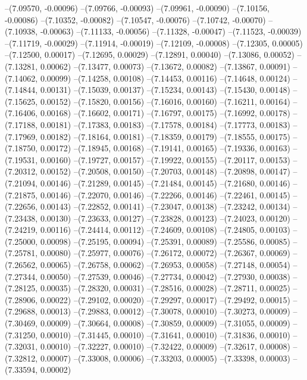 --(7.09570, -0.00096)
--(7.09766, -0.00093)
--(7.09961, -0.00090)
--(7.10156, -0.00086)
--(7.10352, -0.00082)
--(7.10547, -0.00076)
--(7.10742, -0.00070)
--(7.10938, -0.00063)
--(7.11133, -0.00056)
--(7.11328, -0.00047)
--(7.11523, -0.00039)
--(7.11719, -0.00029)
--(7.11914, -0.00019)
--(7.12109, -0.00008)
--(7.12305, 0.00005)
--(7.12500, 0.00017)
--(7.12695, 0.00029)
--(7.12891, 0.00040)
--(7.13086, 0.00052)
--(7.13281, 0.00062)
--(7.13477, 0.00073)
--(7.13672, 0.00082)
--(7.13867, 0.00091)
--(7.14062, 0.00099)
--(7.14258, 0.00108)
--(7.14453, 0.00116)
--(7.14648, 0.00124)
--(7.14844, 0.00131)
--(7.15039, 0.00137)
--(7.15234, 0.00143)
--(7.15430, 0.00148)
--(7.15625, 0.00152)
--(7.15820, 0.00156)
--(7.16016, 0.00160)
--(7.16211, 0.00164)
--(7.16406, 0.00168)
--(7.16602, 0.00171)
--(7.16797, 0.00175)
--(7.16992, 0.00178)
--(7.17188, 0.00181)
--(7.17383, 0.00183)
--(7.17578, 0.00184)
--(7.17773, 0.00183)
--(7.17969, 0.00182)
--(7.18164, 0.00181)
--(7.18359, 0.00179)
--(7.18555, 0.00175)
--(7.18750, 0.00172)
--(7.18945, 0.00168)
--(7.19141, 0.00165)
--(7.19336, 0.00163)
--(7.19531, 0.00160)
--(7.19727, 0.00157)
--(7.19922, 0.00155)
--(7.20117, 0.00153)
--(7.20312, 0.00152)
--(7.20508, 0.00150)
--(7.20703, 0.00148)
--(7.20898, 0.00147)
--(7.21094, 0.00146)
--(7.21289, 0.00145)
--(7.21484, 0.00145)
--(7.21680, 0.00146)
--(7.21875, 0.00146)
--(7.22070, 0.00146)
--(7.22266, 0.00146)
--(7.22461, 0.00145)
--(7.22656, 0.00143)
--(7.22852, 0.00141)
--(7.23047, 0.00138)
--(7.23242, 0.00134)
--(7.23438, 0.00130)
--(7.23633, 0.00127)
--(7.23828, 0.00123)
--(7.24023, 0.00120)
--(7.24219, 0.00116)
--(7.24414, 0.00112)
--(7.24609, 0.00108)
--(7.24805, 0.00103)
--(7.25000, 0.00098)
--(7.25195, 0.00094)
--(7.25391, 0.00089)
--(7.25586, 0.00085)
--(7.25781, 0.00080)
--(7.25977, 0.00076)
--(7.26172, 0.00072)
--(7.26367, 0.00069)
--(7.26562, 0.00065)
--(7.26758, 0.00062)
--(7.26953, 0.00058)
--(7.27148, 0.00054)
--(7.27344, 0.00050)
--(7.27539, 0.00046)
--(7.27734, 0.00042)
--(7.27930, 0.00038)
--(7.28125, 0.00035)
--(7.28320, 0.00031)
--(7.28516, 0.00028)
--(7.28711, 0.00025)
--(7.28906, 0.00022)
--(7.29102, 0.00020)
--(7.29297, 0.00017)
--(7.29492, 0.00015)
--(7.29688, 0.00013)
--(7.29883, 0.00012)
--(7.30078, 0.00010)
--(7.30273, 0.00009)
--(7.30469, 0.00009)
--(7.30664, 0.00008)
--(7.30859, 0.00009)
--(7.31055, 0.00009)
--(7.31250, 0.00010)
--(7.31445, 0.00010)
--(7.31641, 0.00010)
--(7.31836, 0.00010)
--(7.32031, 0.00010)
--(7.32227, 0.00010)
--(7.32422, 0.00009)
--(7.32617, 0.00008)
--(7.32812, 0.00007)
--(7.33008, 0.00006)
--(7.33203, 0.00005)
--(7.33398, 0.00003)
--(7.33594, 0.00002)

